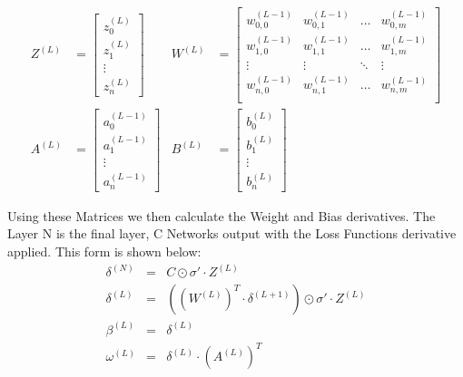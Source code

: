 \begin{flushleft}
                    \begin{align*}
                        Z^{(L)} &=
                        \begin{bmatrix}
                        z^{(L)}_{0} \\
                        z^{(L)}_{1} \\
                        \vdots      \\
                        z^{(L)}_{n} 
                        \end{bmatrix}
                        & W^{(L)} &=
                        \begin{bmatrix}
                        w^{(L-1)}_{0,0} & w^{(L-1)}_{0,1} & \hdots  & w^{(L-1)}_{0,m} \\
                        w^{(L-1)}_{1,0} & w^{(L-1)}_{1,1} & \hdots  & w^{(L-1)}_{1,m} \\
                        \vdots          & \vdots          & \ddots  & \vdots          \\
                        w^{(L-1)}_{n,0} & w^{(L-1)}_{n,1} & \hdots  & w^{(L-1)}_{n,m} \\
                        \end{bmatrix} \\
                        A^{(L)} &=
                        \begin{bmatrix}
                        a^{(L-1)}_{0} \\
                        a^{(L-1)}_{1} \\
                        \vdots      \\
                        a^{(L-1)}_{n} 
                        \end{bmatrix}
                        & B^{(L)} &=
                        \begin{bmatrix}
                        b^{(L)}_{0} \\
                        b^{(L)}_{1} \\
                        \vdots      \\
                        b^{(L)}_{n} 
                        \end{bmatrix}
                    \end{align*}

                    Using these Matrices we then calculate the Weight and Bias derivatives. The Layer N is the final layer, C Networks output with the 
                    Loss Functions derivative applied. This form is shown below: \\

                    \begin{eqnarray*}
                        \delta^{(N)} &=& C \odot \sigma' \cdot Z^{(L)} \\
                        \delta^{(L)} &=& ((W^{(L)})^T \cdot \delta^{(L+1)}) \odot \sigma' \cdot Z^{(L)} \\
                        \beta^{(L)} &=& \delta^{(L)} \\
                        \omega^{(L)} &=& \delta^{(L)} \cdot (A^{(L)})^T \\
                    \end{eqnarray*}
\end{flushleft}